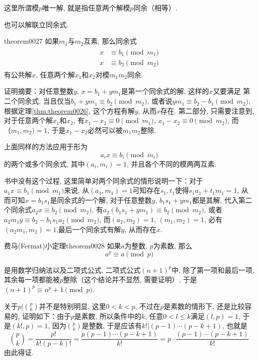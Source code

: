 这里所谓模$p$唯一解, 就是指任意两个解模$p$同余（相等）. 

也可以解联立同余式. 
\begin{theorem}{}{theorem0027}
如果$m_1$与$m_2$互素, 那么同余式
\begin{gather}
\begin{aligned}
x &\equiv b_1 \pmod{m_1} \\
x &\equiv b_2 \pmod{m_2}
\end{aligned}
\end{gather}
有公共解$x$, 任意两个解$x_1$和$x_2$对模$m_1m_2$同余. 
\end{theorem}

证明摘要：对任意整数$y$, $x = b_1 + ym_1$是第一个同余式的解, 这样的$x$又要满足 第二个同余式, 当且仅当$b_1+ym_1 \equiv b_2 \pmod{m_2}$, 或者说$ym_1 \equiv b_2-b_1 \pmod{m_2}$, 根据定理\ref{thm:theorem0026}, 这个方程有解$y$, 从而$x$存在. 第二部分, 只需要注意到, 对于任意两个解$x_1$和$x_2$, 有$x_1-x_2 \equiv 0 \pmod{m_1}$, $x_1-x_2 \equiv 0 \pmod{m_2}$, 而$（m_1, m_2) = 1$, 于是$x_1-x_2$必然可以被$m_1m_2$整除. 

上面同样的方法应用于形为
\[
a_ix \equiv b_i \pmod{m_i}
\]
的两个或多个同余式, 其中$(a_i, m_i)=1$, 并且各个不同的模两两互素. 

书中没有这个过程, 这里简单对两个同余式的情形说明一下：对于$a_1x \equiv b_1 \pmod{m_1}$来说, 从$(a_1, m_1)=1$可知存在$s_1,t_1$使得$s_1a_1+t_1m_1=1$, 从而可知$x = b_1s_1$是同余式的一个解, 对于任意整数$y$, $b_1s_1+ym_1$都是其解, 代入第二个同余式$a_2x \equiv b_2 \pmod{m_2}$, 有$a_2(b_1s_1 + ym_1) \equiv b_2 \pmod{m_2}$, 或者$a_2m_1y \equiv b_2 - b_1s_1a_2 \pmod{m_2}$, 而$(a_2, m_2)=1$, $(m_1, m_2)=1$, 必有$(a_2m_1, m_2)=1$,最后一个同余式有解$y$, 从而存在$x$. 

\begin{theorem}{费马(Fermat)小定理}{theorem0028}
如果$a$为整数, $p$为素数, 那么
\[
a^p \equiv a \pmod{p}
\]
\end{theorem}

是用数学归纳法以及二项式公式, 二项式公式$(n+1)^p$中, 除了第一项和最后一项, 其余每一项都能被$p$整除（这个结论并不显然, 需要证明）, 于是$(n+1)^p \equiv n^p + 1 \pmod{p}$. 

关于$p | {p \choose k}$并不是特别明显, 这里$0 < k < p$, 不过在$p$是素数的情形下, 还是比较容易的, 证明如下：由于$p$是素数, 所以条件中的$k$, 任意$0 < l \le k$满足$(l, p)=1$, 于是$(k!, p)=1$, 因为$p \choose k$是整数, 于是应该有$k!|(p-1)\cdots(p-k+1)$, 也就是
\[
\binom{p}{k} = \frac{p!}{k!(p-k)!} = \frac{p(p-1)\cdots(p-k+1)}{k!} = p \cdot \frac{(p-1)\cdots(p-k+1)}{k!}
\]
由此得证. 


